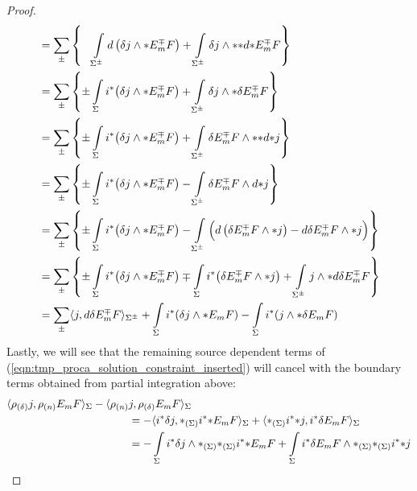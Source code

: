 \begin{proof}
\begin{align}
&= \sum\limits_\pm \left\{ \phantom{\pm} \int\limits_{\Sigma^\pm}  d \left(  \delta j \wedge * E_m^\mp F \right) + \int\limits_{\Sigma^\pm} \delta j \wedge {**} {d {* E_m^\mp}} F \right\} \notag\\
&= \sum\limits_\pm \left\{  \pm \int\limits_{\Sigma}  i^*{\left(  \delta j \wedge * E_m^\mp F \right) }+ \int\limits_{\Sigma^\pm} \delta j \wedge * \delta E_m^\mp F \right\} \notag\\
&= \sum\limits_\pm \left\{  \pm \int\limits_{\Sigma}  i^*{\left(  \delta j \wedge * E_m^\mp F \right) }+ \int\limits_{\Sigma^\pm} \delta E_m^\mp F \wedge {* *}{d*}j \right\} \notag\\
&= \sum\limits_\pm \left\{  \pm \int\limits_{\Sigma}  i^*{\left(  \delta j \wedge * E_m^\mp F \right)} - \int\limits_{\Sigma^\pm} \delta E_m^\mp F \wedge {d*}j \right\} \notag \\
&= \sum\limits_\pm \left\{  \pm \int\limits_{\Sigma}  i^*{\left(  \delta j \wedge * E_m^\mp F \right) }- \int\limits_{\Sigma^\pm} \Big( d \left( \delta E_m^\mp F \wedge *j \right) - d \delta E_m^\mp F \wedge *j \Big) \right\} \notag \\
&= \sum\limits_\pm \left\{  \pm \int\limits_{\Sigma}  i^*{\left(  \delta j \wedge * E_m^\mp F \right)} \mp \int\limits_{\Sigma} i^*{\left( \delta E_m^\mp F \wedge *j \right) }+ \int\limits_{\Sigma^\pm} j \wedge *d \delta E_m^\mp F  \right\} \notag \\
&= \sum\limits_\pm \langle  j , d \delta E_m^\mp F \rangle_{\Sigma^\pm}  + \int\limits_{\Sigma}  i^{*}{\left(  \delta j \wedge * E_m F \right)} - \int\limits_{\Sigma} i^*{\left(j \wedge * \delta E_m F \right)} \label{eqn:tmp_proca_boundary_terms}
\end{align}
Lastly, we will see that the remaining source dependent terms of (\ref{eqn:tmp_proca_solution_constraint_inserted}) will cancel with the boundary terms obtained from partial integration above:
\begin{align}
 \langle  \rhodelta j, \rhon E_m F \rangle_\Sigma \notag  -  \langle \rhon &j, \rhodelta E_m F \rangle_\Sigma \notag\\
 &= - \langle  i^* \delta  j, *_{(\Sigma)}{ i^* *}E_m F \rangle_\Sigma
 +  \langle *_{(\Sigma)} {i^* *}  j, i^* \delta  E_m F \rangle_\Sigma  \notag\\
 &= -\int\limits_{\Sigma}  i^* \delta  j \wedge *_{(\Sigma)} {*_{(\Sigma)}{ i^* {*E_m F }}}
 +  \int\limits_{\Sigma}  i^* \delta  E_m F \wedge  {*_{(\Sigma)}  {*_{(\Sigma)}{ i^* {*  j} }}}    \notag\\

\end{align}
\end{proof}
